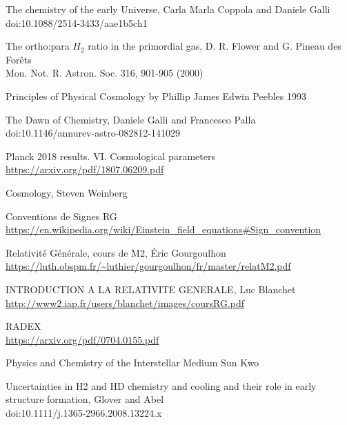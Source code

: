 \documentclass[10pt, a4paper]{report}
\numberwithin{equation}{subsection}
\begin{document}
\begin{thebibliography}{}

The chemistry of the early Universe, Carla Marla Coppola and Daniele Galli
\\doi:10.1088/2514-3433/aae1b5ch1

The ortho:para $H_2$ ratio in the primordial gas, D. R. Flower and G. Pineau des Forêts
\\Mon. Not. R. Astron. Soc. 316, 901-905 (2000)

Principles of Physical Cosmology by Phillip James Edwin Peebles 1993

The Dawn of Chemistry, Daniele Galli and Francesco Palla
\\doi:10.1146/annurev-astro-082812-141029

Planck 2018 results. VI. Cosmological parameters
\\\url{https://arxiv.org/pdf/1807.06209.pdf}

Cosmology, Steven Weinberg

Conventions de Signes RG
\\\url{https://en.wikipedia.org/wiki/Einstein_field_equations#Sign_convention}

Relativité Générale, cours de M2, Éric Gourgoulhon
\\\url{https://luth.obspm.fr/~luthier/gourgoulhon/fr/master/relatM2.pdf}

INTRODUCTION A LA RELATIVITE GENERALE, Luc Blanchet
\\\url{http://www2.iap.fr/users/blanchet/images/coursRG.pdf}

RADEX
\\\url{https://arxiv.org/pdf/0704.0155.pdf}

Physics and Chemistry of the Interstellar Medium Sun Kwo

Uncertainties in H2 and HD chemistry and cooling and their role in early structure formation, Glover and Abel
\\doi:10.1111/j.1365-2966.2008.13224.x



\end{thebibliography}
\end{document}
